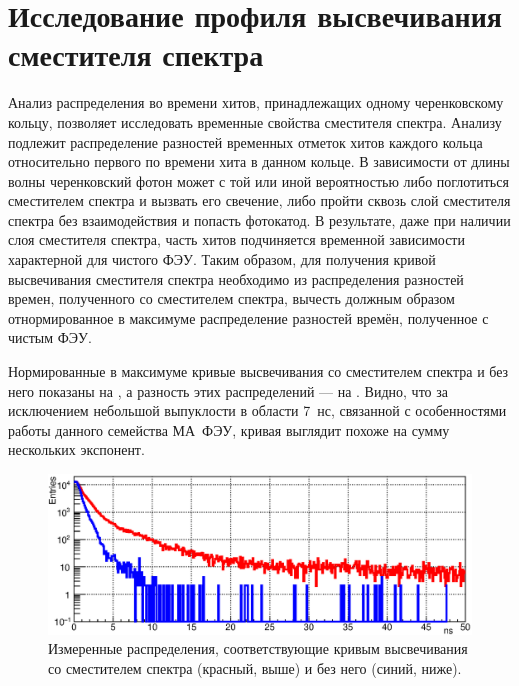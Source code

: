 \section{Исследование профиля высвечивания сместителя спектра}\label{sec:secWLS}

Анализ распределения во времени хитов, принадлежащих одному черенковскому кольцу, позволяет исследовать временные свойства сместителя спектра. Анализу подлежит распределение разностей временных отметок хитов каждого кольца относительно первого по времени хита в данном кольце. В зависимости от длины волны черенковский фотон может с той или иной вероятностью либо поглотиться сместителем спектра и вызвать его свечение, либо пройти сквозь слой сместителя спектра без взаимодействия и попасть фотокатод. В результате, даже при наличии слоя сместителя спектра, часть хитов подчиняется временной зависимости характерной для чистого ФЭУ. Таким образом, для получения кривой высвечивания сместителя спектра необходимо из распределения разностей времен, полученного со сместителем спектра, вычесть должным образом отнормированное в максимуме распределение разностей времён, полученное с чистым ФЭУ.

Нормированные в максимуме кривые высвечивания со сместителем спектра и без него показаны на , а разность этих распределений --- на . Видно, что за исключением небольшой выпуклости в области 7~нс, связанной с особенностями работы данного семейства МА~ФЭУ, кривая выглядит похоже на сумму нескольких экспонент.

\begin{figure}[H]
\centering
\includegraphics[width=1.0\textwidth]{pictures/26_WLS_8feb.eps}
\caption{Измеренные распределения, соответствующие кривым высвечивания со сместителем спектра (красный, выше) и без него (синий, ниже).}
\label{fig:WLStwoCurves}
\end{figure}

